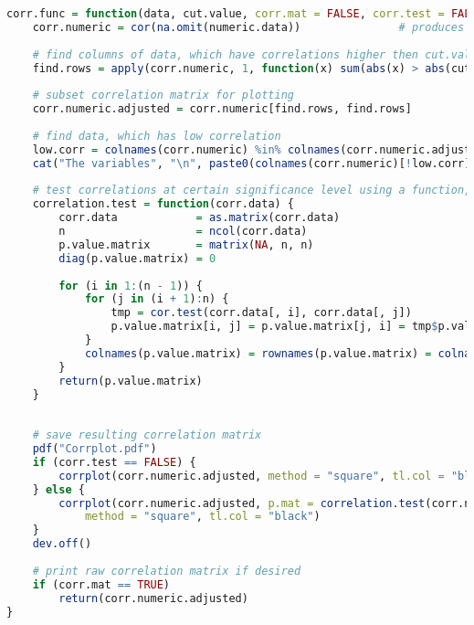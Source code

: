 \begin{lstlisting}[language=R]
corr.func = function(data, cut.value, corr.mat = FALSE, corr.test = FALSE, significance = 0.05) {
    corr.numeric = cor(na.omit(numeric.data))               # produces correlation matrix of all numeric variables in the dataset
    
    # find columns of data, which have correlations higher then cut.value
    find.rows = apply(corr.numeric, 1, function(x) sum(abs(x) > abs(cut.value)) > 1)
    
    # subset correlation matrix for plotting
    corr.numeric.adjusted = corr.numeric[find.rows, find.rows]
    
    # find data, which has low correlation
    low.corr = colnames(corr.numeric) %in% colnames(corr.numeric.adjusted)
    cat("The variables", "\n", paste0(colnames(corr.numeric)[!low.corr], collapse = ", "), "\n", "have very low bivariate correlations with the other numeric variables in the training data set!")
    
    # test correlations at certain significance level using a function, that produces a p-value matrix for all bivariate correlations
    correlation.test = function(corr.data) {
        corr.data            = as.matrix(corr.data)
        n                    = ncol(corr.data)
        p.value.matrix       = matrix(NA, n, n)
        diag(p.value.matrix) = 0
        
        for (i in 1:(n - 1)) {
            for (j in (i + 1):n) {
                tmp = cor.test(corr.data[, i], corr.data[, j])            # testing correlation
                p.value.matrix[i, j] = p.value.matrix[j, i] = tmp$p.value # filling p-value matrix with respective p-values
            }
            colnames(p.value.matrix) = rownames(p.value.matrix) = colnames(corr.numeric.adjusted)
        }
        return(p.value.matrix)
    }
    
    
    # save resulting correlation matrix
    pdf("Corrplot.pdf")
    if (corr.test == FALSE) {
        corrplot(corr.numeric.adjusted, method = "square", tl.col = "black")
    } else {
        corrplot(corr.numeric.adjusted, p.mat = correlation.test(corr.numeric.adjusted), sig.level = significance, 
            method = "square", tl.col = "black")
    }
    dev.off()
    
    # print raw correlation matrix if desired
    if (corr.mat == TRUE) 
        return(corr.numeric.adjusted)
}
\end{lstlisting}
